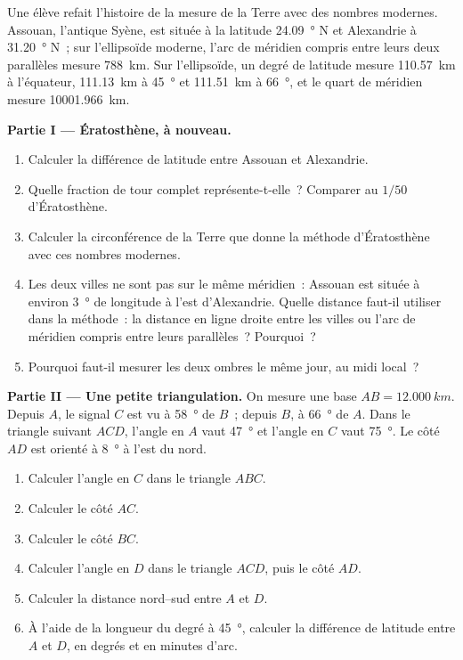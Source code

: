 \begin{problem}
\label{pb:g10:measuring-the-earth:1}
Une élève refait l'histoire de la mesure de la Terre avec des nombres
modernes. Assouan, l'antique Syène, est située à la latitude
\qty{24.09}{\degree} N et Alexandrie à \qty{31.20}{\degree} N~; sur
l'ellipsoïde moderne, l'arc de méridien compris entre leurs deux parallèles
mesure \qty{788}{km}. Sur l'ellipsoïde, un degré de latitude mesure
\qty{110.57}{km} à l'équateur, \qty{111.13}{km} à \qty{45}{\degree} et
\qty{111.51}{km} à \qty{66}{\degree}, et le quart de méridien mesure
\qty{10001.966}{km}.

\medskip
\noindent\textbf{Partie I --- Ératosthène, à nouveau.}
\begin{enumerate}
  \item Calculer la différence de latitude entre Assouan et Alexandrie.
  \item Quelle fraction de tour complet représente-t-elle~? Comparer au
        $1/50$ d'Ératosthène.
  \item Calculer la circonférence de la Terre que donne la méthode
        d'Ératosthène avec ces nombres modernes.
  \item Les deux villes ne sont pas sur le même méridien~: Assouan est
        située à environ \qty{3}{\degree} de longitude à l'est d'Alexandrie.
        Quelle distance faut-il utiliser dans la méthode~: la distance en
        ligne droite entre les villes ou l'arc de méridien compris entre
        leurs parallèles~? Pourquoi~?
  \item Pourquoi faut-il mesurer les deux ombres le même jour, au midi
        local~?
\end{enumerate}

\medskip
\noindent\textbf{Partie II --- Une petite triangulation.}
On mesure une base $AB = \qty{12.000}{km}$. Depuis $A$, le signal $C$ est
vu à \qty{58}{\degree} de $B$~; depuis $B$, à \qty{66}{\degree} de $A$.
Dans le triangle suivant $ACD$, l'angle en $A$ vaut \qty{47}{\degree} et
l'angle en $C$ vaut \qty{75}{\degree}. Le côté $AD$ est orienté à
\qty{8}{\degree} à l'est du nord.
\begin{enumerate}[resume]
  \item Calculer l'angle en $C$ dans le triangle $ABC$.
  \item Calculer le côté $AC$.
  \item Calculer le côté $BC$.
  \item Calculer l'angle en $D$ dans le triangle $ACD$, puis le côté $AD$.
  \item Calculer la distance nord--sud entre $A$ et $D$.
  \item À l'aide de la longueur du degré à \qty{45}{\degree}, calculer la
        différence de latitude entre $A$ et $D$, en degrés et en minutes
        d'arc.
\end{enumerate}


\end{problem}
